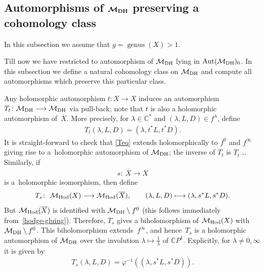 \documentclass[pdftex]{sigma}
\numberwithin{equation}{section}
\begin{document}
\subsection[Automorphisms of ${\mathcal M}_{\rm DH}$ preserving a cohomology class]{Automorphisms of $\boldsymbol{{\mathcal M}_{\rm DH}}$ preserving a cohomology class}

In this subsection we assume that $g = \operatorname{genus}(X) > 1$.

Till now we have restricted to automorphism of ${\mathcal M}_{\rm DH}$ lying in ${\rm Aut}({\mathcal M}_{\rm DH})_0$. In this subsection we def\/ine a natural cohomology class on ${\mathcal M}_{\rm DH}$ and compute all automorphisms which preserve this particular class.

Any holomorphic automorphism $t \colon X \longrightarrow X$ induces an automorphism $T_t \colon{\mathcal M}_{\rm DH} \longrightarrow {\mathcal M}_{\rm DH}$ via pull-back; note that $t$ is also a holomorphic automorphism of~$\overline X$. More precisely, for $\lambda \in \mathbb C^*$ and $(\lambda, L, D) \in f^\lambda$, def\/ine
\begin{gather}\label{Teq}
T_t(\lambda, L, D) = (\lambda, t^*L, t^* D) .
\end{gather}
It is straight-forward to check that \eqref{Teq} extends holomorphically to $f^0$ and $f^\infty$ giving rise to a~holomorphic automorphism of ${\mathcal M}_{\rm DH}$; the inverse of $T_t$ is $T_{t^{-1}}$. Similarly, if \begin{gather*}s \colon \ \overline{X} \longrightarrow X\end{gather*} is a~holomorphic isomorphism, then def\/ine
\begin{gather*}
T_{s} \colon \ \mathcal M_{\rm Hod}(X) \longrightarrow \mathcal M_{\rm Hod}(\overline{X}) ,\qquad (\lambda, L, D) \longmapsto (\lambda, s^*L, s^*D).
\end{gather*}
But $\mathcal M_{\rm Hod}(\overline{X})$ is identif\/ied with ${\mathcal M}_{\rm DH}\setminus f^0$ (this follows immediately from~\eqref{hodge-gluing}). Therefore, $T_{s}$ gives a biholomorphism of $\mathcal M_{\rm Hod}(X)$ with ${\mathcal M}_{\rm DH}\setminus f^0$. This biholomorphism extends~$f^\infty$, and hence~$T_{s}$ is a holomorphic automorphism of ${\mathcal M}_{\rm DH}$ over the involution $\lambda \longmapsto \frac{1}{\lambda}$ of $\mathbb CP^1$. Explicitly, for $\lambda\neq0,\infty$ it is given by
\begin{gather*}T_{s}(\lambda, L, D)=\varphi^{-1}((\lambda, s^*L, s^* D)).\end{gather*}
\end{document}

